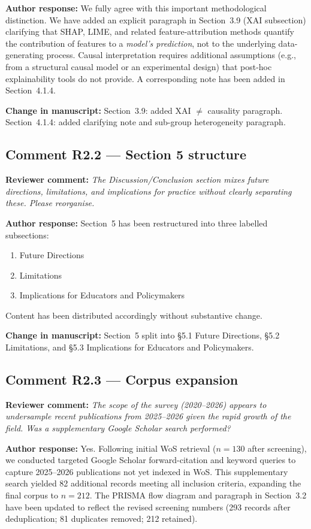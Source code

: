 \documentclass[12pt,a4paper]{article}
\newcommand{\reviewer}[1]{\textcolor{reviewercolor}{\textbf{Reviewer comment:} \textit{#1}}}
\newcommand{\response}[1]{\textcolor{authorcolor}{\textbf{Author response:} #1}}
\newcommand{\change}[1]{\textbf{Change in manuscript:} #1}
\begin{document}
\response{We fully agree with this important methodological distinction. We have added an explicit paragraph in Section~3.9 (XAI subsection) clarifying that SHAP, LIME, and related feature-attribution methods quantify the contribution of features to a \emph{model's prediction}, not to the underlying data-generating process. Causal interpretation requires additional assumptions (e.g., from a structural causal model or an experimental design) that post-hoc explainability tools do not provide. A corresponding note has been added in Section~4.1.4.}

\change{Section~3.9: added XAI $\neq$ causality paragraph. Section~4.1.4: added clarifying note and sub-group heterogeneity paragraph.}

\bigskip

\subsection*{Comment R2.2 — Section 5 structure}

\reviewer{The Discussion/Conclusion section mixes future directions, limitations, and implications for practice without clearly separating these. Please reorganise.}

\response{Section~5 has been restructured into three labelled subsections:
\begin{enumerate}[noitemsep]
  \item[\S5.1] Future Directions
  \item[\S5.2] Limitations
  \item[\S5.3] Implications for Educators and Policymakers
\end{enumerate}
Content has been distributed accordingly without substantive change.}

\change{Section~5 split into \S5.1 Future Directions, \S5.2 Limitations, and \S5.3 Implications for Educators and Policymakers.}

\bigskip

\subsection*{Comment R2.3 — Corpus expansion}

\reviewer{The scope of the survey (2020--2026) appears to undersample recent publications from 2025--2026 given the rapid growth of the field. Was a supplementary Google Scholar search performed?}

\response{Yes. Following initial WoS retrieval ($n = 130$ after screening), we conducted targeted Google Scholar forward-citation and keyword queries to capture 2025--2026 publications not yet indexed in WoS. This supplementary search yielded 82 additional records meeting all inclusion criteria, expanding the final corpus to $n = 212$. The PRISMA flow diagram and paragraph in Section~3.2 have been updated to reflect the revised screening numbers (293 records after deduplication; 81 duplicates removed; 212 retained).}
\end{document}
